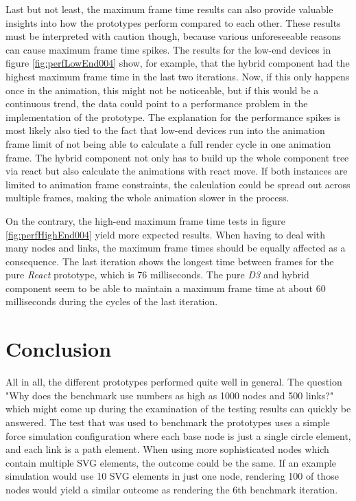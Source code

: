 Last but not least, the maximum frame time results can also provide valuable insights into how the prototypes perform compared to each other. These results must be interpreted with caution though, because various unforeseeable reasons can cause maximum frame time spikes. The results for the low-end devices in figure \ref{fig:perfLowEnd004} show, for example, that the hybrid component had the highest maximum frame time in the last two iterations. Now, if this only happens once in the animation, this might not be noticeable, but if this would be a continuous trend, the data could point to a performance problem in the implementation of the prototype. The explanation for the performance spikes is most likely also tied to the fact that low-end devices run into the animation frame limit of not being able to calculate a full render cycle in one animation frame. The hybrid component not only has to build up the whole component tree via react but also calculate the animations with react move. If both instances are limited to animation frame constraints, the calculation could be spread out across multiple frames, making the whole animation slower in the process.

On the contrary, the high-end maximum frame time tests in figure \ref{fig:perfHighEnd004} yield more expected results. When having to deal with many nodes and links, the maximum frame times should be equally affected as a consequence. The last iteration shows the longest time between frames for the pure \emph{React} prototype, which is 76 milliseconds. The pure \emph{D3} and hybrid component seem to be able to maintain a maximum frame time at about 60 milliseconds during the cycles of the last iteration.


\section{Conclusion}

All in all, the different prototypes performed quite well in general. The question "Why does the benchmark use numbers as high as 1000 nodes and 500 links?" which might come up during the examination of the testing results can quickly be answered. The test that was used to benchmark the prototypes uses a simple force simulation configuration where each base node is just a single circle element, and each link is a path element. When using more sophisticated nodes which contain multiple SVG elements, the outcome could be the same. If an example simulation would use 10 SVG elements in just one node, rendering 100 of those nodes would yield a similar outcome as rendering the 6th benchmark iteration.

